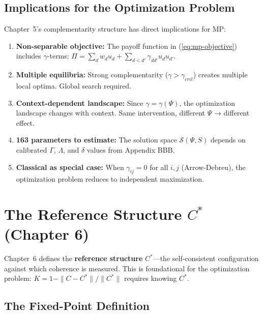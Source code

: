 \subsection{Implications for the Optimization Problem}

Chapter~5's complementarity structure has direct implications for MP:

\begin{enumerate}
\item \textbf{Non-separable objective:} The payoff function in (\ref{eq:mp-objective}) includes
      $\gamma$-terms: $\Pi = \sum_d w_d u_d + \sum_{d<d'} \gamma_{dd'} u_d u_{d'}$.

\item \textbf{Multiple equilibria:} Strong complementarity ($\gamma > \gamma_{crit}$) creates
      multiple local optima. Global search required.

\item \textbf{Context-dependent landscape:} Since $\gamma = \gamma(\Psi)$, the optimization
      landscape changes with context. Same intervention, different $\Psi$ → different effect.

\item \textbf{163 parameters to estimate:} The solution space $\mathcal{S}(\Psi, S)$ depends
      on calibrated $\Gamma$, $\Lambda$, and $\delta$ values from Appendix BBB.

\item \textbf{Classical as special case:} When $\gamma_{ij} = 0$ for all $i,j$ (Arrow-Debreu),
      the optimization problem reduces to independent maximization.
\end{enumerate}

\section{The Reference Structure $C^*$ (Chapter 6)}
\label{sec:mp-reference}

Chapter~6 defines the \textbf{reference structure} $C^*$---the self-consistent configuration
against which coherence is measured. This is foundational for the optimization problem:
$K = 1 - \|C - C^*\|/\|C^*\|$ requires knowing $C^*$.

\subsection{The Fixed-Point Definition}

